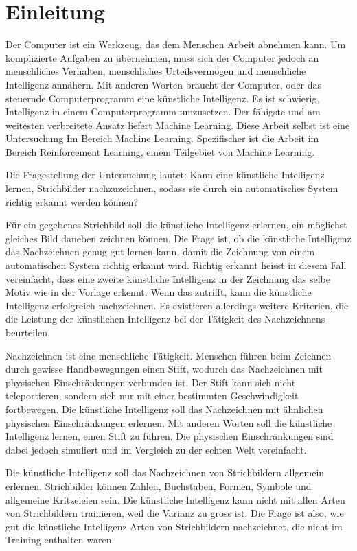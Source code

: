 \chapter{Einleitung}
Der Computer ist ein Werkzeug, das dem Menschen Arbeit abnehmen kann. Um
komplizierte Aufgaben zu übernehmen, muss sich der Computer jedoch an
menschliches Verhalten, menschliches Urteilsvermögen und menschliche Intelligenz
annähern. Mit anderen Worten braucht der Computer, oder das steuernde
Computerprogramm eine künstliche Intelligenz. Es ist schwierig, Intelligenz in
einem Computerprogramm umzusetzen. Der fähigste und am weitesten verbreitete
Ansatz liefert Machine Learning.  Diese Arbeit selbst ist eine Untersuchung Im
Bereich Machine Learning. Spezifischer ist die Arbeit im Bereich Reinforcement
Learning, einem Teilgebiet von Machine Learning.


Die Fragestellung der Untersuchung lautet: Kann eine künstliche Intelligenz
lernen, Strichbilder nachzuzeichnen, sodass sie durch ein automatisches System
richtig erkannt werden können?

Für ein gegebenes Strichbild soll die künstliche Intelligenz erlernen, ein
möglichst gleiches Bild daneben zeichnen können. Die Frage ist, ob die
künstliche Intelligenz das Nachzeichnen genug gut lernen kann, damit die
Zeichnung von einem automatischen System richtig erkannt wird. Richtig erkannt
heisst in diesem Fall vereinfacht, dass eine zweite künstliche Intelligenz in
der Zeichnung das selbe Motiv wie in der Vorlage erkennt. Wenn das zutrifft,
kann die künstliche Intelligenz erfolgreich nachzeichnen. Es existieren
allerdings weitere Kriterien, die die Leistung der künstlichen Intelligenz bei der Tätigkeit des
Nachzeichnens beurteilen.

Nachzeichnen ist eine menschliche Tätigkeit. Menschen führen beim Zeichnen durch
gewisse Handbewegungen einen Stift, wodurch das Nachzeichnen mit physischen
Einschränkungen verbunden ist. Der Stift kann sich nicht teleportieren, sondern
sich nur mit einer bestimmten Geschwindigkeit fortbewegen. Die künstliche
Intelligenz soll das Nachzeichnen mit ähnlichen physischen Einschränkungen
erlernen. Mit anderen Worten soll die künstliche Intelligenz lernen, einen Stift
zu führen.  Die physischen Einschränkungen sind dabei jedoch simuliert und im
Vergleich zu der echten Welt vereinfacht. 

Die künstliche Intelligenz soll das Nachzeichnen von Strichbildern allgemein
erlernen. Strichbilder können Zahlen, Buchstaben, Formen, Symbole und allgemeine
Kritzeleien sein. Die künstliche Intelligenz kann nicht mit allen Arten von
Strichbildern trainieren, weil die Varianz zu gross ist. Die Frage ist also, wie
gut die künstliche Intelligenz Arten von Strichbildern nachzeichnet, die nicht im Training
enthalten waren.


